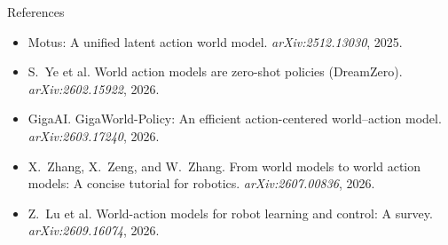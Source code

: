 \documentclass[xcolor=dvipsnames,aspectratio=169]{beamer}
\begin{document}
\begin{frame}{References}
\begin{itemize}
        \item Motus: A unified latent action world model. \emph{arXiv:2512.13030}, 2025.
        \item S.~Ye et al. World action models are zero-shot policies (DreamZero). \emph{arXiv:2602.15922}, 2026.
        \item GigaAI. GigaWorld-Policy: An efficient action-centered world--action model. \emph{arXiv:2603.17240}, 2026.
        \item X.~Zhang, X.~Zeng, and W.~Zhang. From world models to world action models: A concise tutorial for robotics. \emph{arXiv:2607.00836}, 2026.
        \item Z.~Lu et al. World-action models for robot learning and control: A survey. \emph{arXiv:2609.16074}, 2026.
    \end{itemize}
\end{frame}
\end{document}
